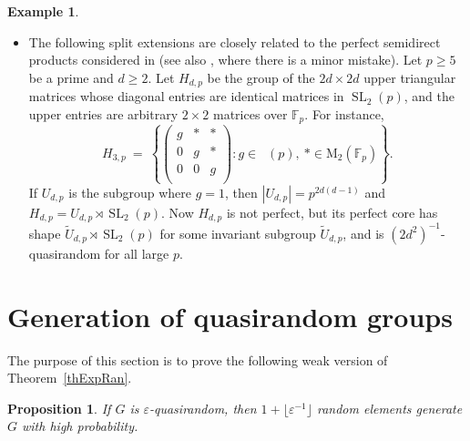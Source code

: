 \documentclass[11pt,reqno]{amsart}
\numberwithin{equation}{section}
\newtheorem{proposition}[theorem]{Proposition}
\theoremstyle{definition}
\newtheorem{example}[theorem]{Example}
\theoremstyle{remark}
\newcommand{\SL}{\mathop{\mathrm{SL}}}
\newcommand{\SLL}{\mathop{\mathrm{SL_2}}}
\begin{document}
\begin{example}
\begin{itemize}
\item[(f)] The following split extensions are closely related
to the perfect semidirect products considered in \cite[Page~2367]{GS25}
(see also \cite[Example~4.7]{BS25}, where there is a minor mistake).
	Let $p \geq 5$ be a prime and $d \geq 2$.
	Let $H_{d,p}$ be the group of the $2d \times 2d$ upper triangular matrices whose diagonal entries
	are identical matrices in $\SL_2(p)$,
	and the upper entries are arbitrary $2 \times 2$ matrices over $\mathbb{F}_p$.
	For instance,
	$$
	H_{3,p} \> = \>
	\left \{ 
	\left(
	\begin{array}{ccc}
		g & * & *  \\
		0 & g & *  \\
		0 & 0 & g  \\
	\end{array}
	\right) : g \in \SLL(p) , \> * \in \mathrm{M}_2(\mathbb{F}_p)
	\right \} .
	$$
	If $U_{d,p}$ is the subgroup where $g =1$, then $|U_{d,p}|=p^{2d(d-1)}$ and $H_{d,p} = U_{d,p} \rtimes \SL_2(p)$.
	Now $H_{d,p}$ is not perfect, but its perfect core has shape $\widetilde{U}_{d,p} \rtimes \SL_2(p)$
	for some invariant subgroup $\widetilde{U}_{d,p}$,
	and is $(2d^2)^{-1}$-quasirandom for all large $p$.
\end{itemize}
\end{example}




































\vspace{0.1cm}
\section{Generation of quasirandom groups} \label{secGen}

The purpose of this section is to prove
the following weak version of Theorem~\ref{thExpRan}.

\begin{proposition} \label{propRanGen} 
If $G$ is $\varepsilon$-quasirandom,
then $1 + \lfloor \varepsilon^{-1} \rfloor$ random elements generate $G$ with high probability.
\end{proposition} 
\end{document}
